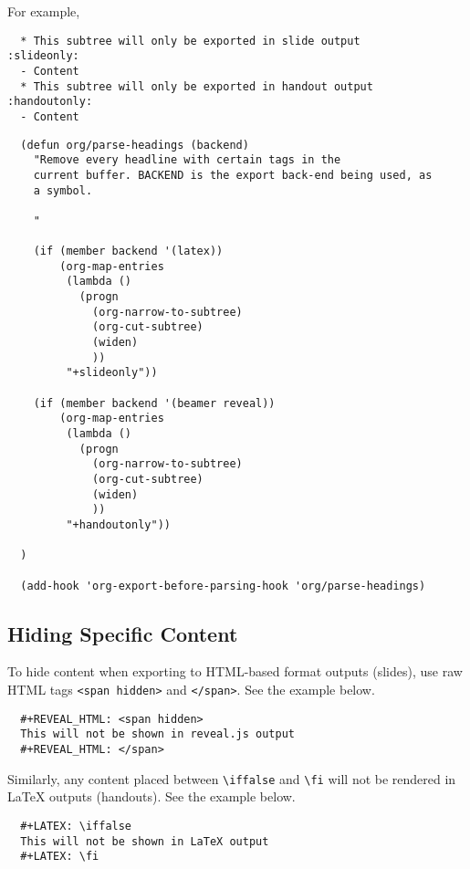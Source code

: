 \documentclass[10pt,article]{article}
\begin{document}
For example,

\begin{verbatim}
  * This subtree will only be exported in slide output      :slideonly:
  - Content
  * This subtree will only be exported in handout output    :handoutonly:
  - Content
\end{verbatim}

{\small
\begin{verbatim}
  (defun org/parse-headings (backend)
    "Remove every headline with certain tags in the
    current buffer. BACKEND is the export back-end being used, as
    a symbol.
  
    "
  
    (if (member backend '(latex))
        (org-map-entries
         (lambda ()
           (progn
             (org-narrow-to-subtree)
             (org-cut-subtree)
             (widen)
             ))
         "+slideonly"))
  
    (if (member backend '(beamer reveal))
        (org-map-entries
         (lambda ()
           (progn
             (org-narrow-to-subtree)
             (org-cut-subtree)
             (widen)
             ))
         "+handoutonly"))
  
  )
  
  (add-hook 'org-export-before-parsing-hook 'org/parse-headings)
\end{verbatim}
}
\subsection{Hiding Specific Content}
\label{sec:orgd3b35ef}
To hide content when exporting to HTML-based format outputs (slides), use raw
HTML tags \texttt{<span hidden>} and \texttt{</span>}. See the example below.

{\small
\begin{verbatim}
  #+REVEAL_HTML: <span hidden>
  This will not be shown in reveal.js output
  #+REVEAL_HTML: </span>
\end{verbatim}
}

Similarly, any content placed between \texttt{\textbackslash{}iffalse} and \texttt{\textbackslash{}fi} will not be
rendered in \LaTeX{} outputs (handouts). See the example below.

{\small
\begin{verbatim}
  #+LATEX: \iffalse
  This will not be shown in LaTeX output
  #+LATEX: \fi
\end{verbatim}
}
\end{document}
